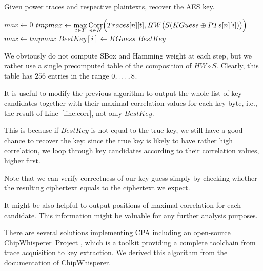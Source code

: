 	\begin{alg}
	\label{alg:cpa}
	Given power traces and respective plaintexts, recover the AES key.
		\begin{algorithmic}[1]
					\State $max \gets 0$
						\State $tmpmax \gets \max\limits_{t\in T} \operatorname*{Corr}\limits_{n\in N}\Bigl(Traces[n][t], HW\bigl(S(KGuess\oplus PTs[n][i])\bigr)\Bigr)$
							\label{line:corr}
							\State $max \gets tmpmax$
							\State $BestKey[i] \gets KGuess$
						\EndIf
					\EndFor
				\EndFor
				\State\Return $BestKey$
			\EndFunction
		\end{algorithmic}
	\end{alg}
	
	\begin{remark}
	\label{rem:attacklookup}
		We obviously do not compute SBox and Hamming weight at each step, but we rather use a single precomputed table of the composition of $HW\circ S$. Clearly, this table has $256$ entries in the range $0 , \ldots , 8$.
	\end{remark}
	
	\begin{note}
	\label{note:fulllist}
		It is useful to modify the previous algorithm to output the whole list of key candidates together with their maximal correlation values for each key byte, i.e., the result of Line~\ref{line:corr}, not only $BestKey$.
		
		This is because if $BestKey$ is not equal to the true key, we still have a good chance to recover the key: since the true key is likely to have rather high correlation, we loop through key candidates according to their correlation values, higher first.
		
		Note that we can verify correctness of our key guess simply by checking whether the resulting ciphertext equals to the ciphertext we expect.
	\end{note}
	
	\begin{note}
	\label{note:leakpos}
		It might be also helpful to output positions of maximal correlation for each candidate. This information might be valuable for any further analysis purposes.
	\end{note}
	
	There are several solutions implementing CPA including an open-source ChipWhisperer\texttrademark\ Project \cite{chipwhisperer}, which is a toolkit providing a complete toolchain from trace acquisition to key extraction. We derived this algorithm from the documentation of ChipWhisperer\texttrademark.



